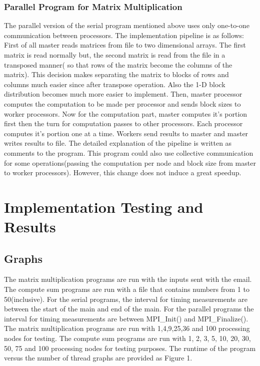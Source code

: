 \documentclass{article}
\begin{document}
\subsubsection{Parallel Program for Matrix Multiplication}
\qquad The parallel version of the serial program mentioned above uses only one-to-one communication between processors. The implementation pipeline is as follows: First of all master reads matrices from file to two dimensional arrays. The first matrix is read normally but, the second matrix is read from the file in a transposed manner( so that rows of the matrix become the columns  of the matrix). This decision makes separating the matrix to blocks of rows and columns much easier since after transpose operation. Also the 1-D block distribution becomes much more easier to implement. Then, master processor computes the computation to be made per processor and sends block sizes to worker processors. Now for the computation part, master computes it's portion first then the turn for computation passes to other processors. Each processor computes it's portion  one at a time. Workers send results to master and master writes results to file. The detailed explanation of the pipeline is written as comments to the program. This program could also use collective communication for some operations(passing the computation per node and block size from master to worker processors). However, this change does not induce a great speedup. 

\section{Implementation Testing and Results}

\subsection{Graphs}
\qquad The matrix multiplication programs are run with the inputs sent with the email. The compute sum programs are run with a file that contains numbers from 1 to 50(inclusive). For the serial programs, the interval for timing measurements are between the start of the main and end of the main. For the parallel programs the interval for timing measurements are between MPI\_Init() and MPI\_Finalize(). The matrix multiplication programs are run with  1,4,9,25,36 and 100 processing nodes for testing. The compute sum programs are run with 1, 2, 3, 5, 10, 20, 30, 50, 75 and 100 processing nodes for testing purposes. The runtime of the program versus the number of thread graphs are provided as Figure 1. \\
\end{document}
